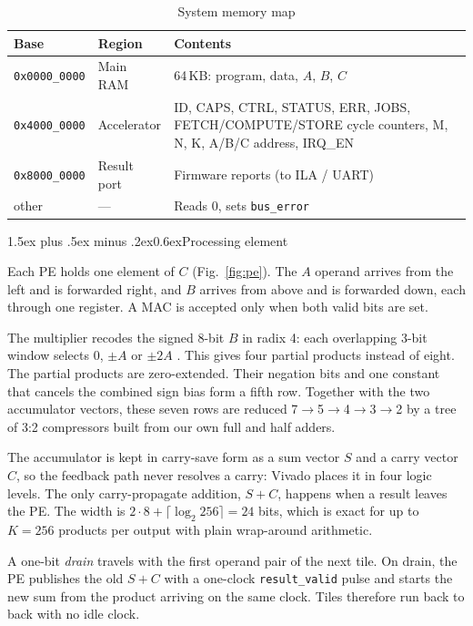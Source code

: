 \documentclass[10pt,twocolumn,a4paper]{article}
\makeatletter
\renewcommand\subsection{\@startsection{subsection}{2}{\z@}%
  {1.5ex plus .5ex minus .2ex}{0.6ex}{\normalfont\itshape}}
\makeatother
\begin{document}
\begin{table}[t]
\caption{System memory map}\label{tab:map}
\centering\footnotesize
\begin{tabularx}{\columnwidth}{llL}
\toprule
Base & Region & Contents \\
\midrule
\texttt{0x0000\_0000} & Main RAM & 64\,KB: program, data, $A$, $B$, $C$ \\
\texttt{0x4000\_0000} & Accelerator & ID, CAPS, CTRL, STATUS, ERR, JOBS, FETCH/COMPUTE/STORE cycle counters, M, N, K, A/B/C address, IRQ\_EN \\
\texttt{0x8000\_0000} & Result port & Firmware reports (to ILA / UART) \\
other & --- & Reads 0, sets \texttt{bus\_error} \\
\bottomrule
\end{tabularx}
\end{table}

\subsection{Processing element}

Each PE holds one element of $C$ (Fig.~\ref{fig:pe}). The $A$ operand
arrives from the left and is forwarded right, and $B$ arrives from above and is
forwarded down, each through one register. A MAC is accepted only when both
valid bits are set.

The multiplier recodes the signed 8-bit $B$ in radix 4: each overlapping
3-bit window selects $0$, $\pm A$ or $\pm2A$ \cite{macsorley}. This gives four
partial products instead of eight. The partial products are zero-extended. Their
negation bits and one constant that cancels the combined sign bias form a fifth
row. Together with the two accumulator vectors, these seven rows are reduced
7$\to$5$\to$4$\to$3$\to$2 by a tree of 3:2 compressors built from our own full
and half adders.

The accumulator is kept in carry-save form as a sum vector $S$ and a carry
vector $C$, so the feedback path never resolves a carry: Vivado places it in
four logic levels. The only carry-propagate addition, $S+C$, happens when a
result leaves the PE. The width is
$2\cdot8+\lceil\log_2 256\rceil=24$ bits, which is exact for up to $K=256$
products per output with plain wrap-around arithmetic.

A one-bit \emph{drain} travels with the first operand pair of the next tile.
On drain, the PE publishes the old $S+C$ with a one-clock
\texttt{result\_valid} pulse and starts the new sum from the product arriving
on the same clock. Tiles therefore run back to back with no idle clock.
\end{document}
